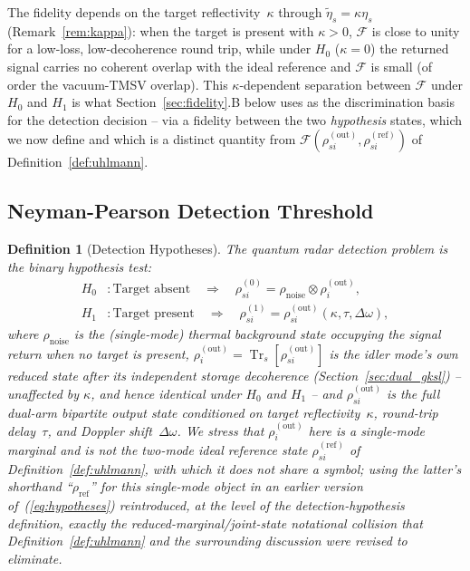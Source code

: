 \documentclass[journal]{IEEEtran}
\newtheorem{definition}{Definition}
\DeclareMathOperator{\Tr}{Tr}
\begin{document}
The fidelity depends on the target reflectivity~$\kappa$ through $\tilde\eta_s=\kappa\eta_s$ (Remark~\ref{rem:kappa}): when the target is present with $\kappa>0$, $\mathcal F$ is close to unity for a low-loss, low-decoherence round trip, while under $H_0$ ($\kappa=0$) the returned signal carries no coherent overlap with the ideal reference and $\mathcal F$ is small (of order the vacuum-TMSV overlap). This $\kappa$-dependent separation between $\mathcal F$ under $H_0$ and $H_1$ is what Section~\ref{sec:fidelity}.B below uses as the discrimination basis for the detection decision -- via a fidelity between the two \emph{hypothesis} states, which we now define and which is a distinct quantity from $\mathcal F(\rho_{si}^{(\text{out})},\rho_{si}^{(\text{ref})})$ of Definition~\ref{def:uhlmann}.

\subsection{Neyman-Pearson Detection Threshold}

\begin{definition}[Detection Hypotheses]\label{def:hypotheses}
The quantum radar detection problem is the binary hypothesis test:
\begin{equation}\label{eq:hypotheses}
\begin{aligned}
H_0 &: \text{Target absent} \quad \Rightarrow \quad \rho_{si}^{(0)} = \rho_{\text{noise}} \otimes \rho_i^{(\text{out})}, \\
H_1 &: \text{Target present} \quad \Rightarrow \quad \rho_{si}^{(1)} = \rho_{si}^{(\text{out})}(\kappa, \tau, \Delta\omega),
\end{aligned}
\end{equation}
where $\rho_{\text{noise}}$ is the (single-mode) thermal background state occupying the signal return when no target is present, $\rho_i^{(\text{out})} = \Tr_s[\rho_{si}^{(\text{out})}]$ is the idler mode's own reduced state after its independent storage decoherence (Section~\ref{sec:dual_gksl}) -- unaffected by $\kappa$, and hence identical under $H_0$ and $H_1$ -- and $\rho_{si}^{(\text{out})}$ is the full dual-arm bipartite output state conditioned on target reflectivity~$\kappa$, round-trip delay~$\tau$, and Doppler shift~$\Delta\omega$. We stress that $\rho_i^{(\text{out})}$ here is a single-mode marginal and is \emph{not} the two-mode ideal reference state $\rho_{si}^{(\text{ref})}$ of Definition~\ref{def:uhlmann}, with which it does not share a symbol; using the latter's shorthand ``$\rho_{\text{ref}}$'' for this single-mode object in an earlier version of~(\ref{eq:hypotheses}) reintroduced, at the level of the detection-hypothesis definition, exactly the reduced-marginal/joint-state notational collision that Definition~\ref{def:uhlmann} and the surrounding discussion were revised to eliminate.
\end{definition}
\end{document}
